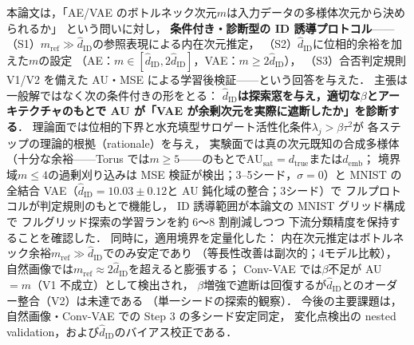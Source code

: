 \documentclass[11pt,a4paper]{jsarticle}
\newcommand{\hatdID}{\hat{d}_{\mathrm{ID}}}
\newcommand{\dtrue}{d_{\mathrm{true}}}
\newcommand{\AUsat}{\mathrm{AU}_{\mathrm{sat}}}
\newcommand{\demb}{d_{\mathrm{emb}}}
\begin{document}
本論文は，「AE/VAE のボトルネック次元$m$は入力データの多様体次元から決められるか」
という問いに対し，
\textbf{条件付き・診断型の ID 誘導プロトコル}——
（S1）$m_{\mathrm{ref}} \gg \hatdID$の参照表現による内在次元推定，
（S2）$\hatdID$に位相的余裕を加えた$m$の設定
（AE：$m \in [\hatdID, 2\hatdID]$，VAE：$m \geq 2\hatdID$），
（S3）合否判定規則 V1/V2 を備えた AU・MSE による学習後検証——という回答を与えた．
主張は一般解ではなく次の条件付きの形をとる：
\textbf{$\hatdID$は探索窓を与え，適切な$\beta$とアーキテクチャのもとで
AU が「VAE が余剰次元を実際に遮断したか」を診断する}．
理論面では位相的下界と水充填型サロゲート活性化条件$\lambda_j > \beta\tau^2$が
各ステップの理論的根拠（rationale）を与え，
実験面では真の次元既知の合成多様体
（十分な余裕——Torus では$m \geq 5$——のもとで$\AUsat = \dtrue$または$\demb$；
境界域$m \leq 4$の過剰刈り込みは MSE 検証が検出；3--5シード，$\sigma = 0$）と
MNIST の全結合 VAE（$\hatdID = 10.03 \pm 0.12$と AU 鈍化域の整合；3シード）で
フルプロトコルが判定規則のもとで機能し，
ID 誘導範囲が本論文の MNIST グリッド構成で
フルグリッド探索の学習ランを約 6〜8 割削減しつつ
下流分類精度を保持することを確認した．
同時に，適用境界を定量化した：
内在次元推定はボトルネック余裕$m_{\mathrm{ref}} \gg \hatdID$でのみ安定であり
（等長性改善は副次的；4モデル比較），
自然画像では$m_{\mathrm{ref}} \approx 2\hatdID$を超えると膨張する；
Conv-VAE では$\beta$不足が AU $= m$（V1 不成立）として検出され，
$\beta$増強で遮断は回復するが$\hatdID$とのオーダー整合（V2）は未達である
（単一シードの探索的観察）．
今後の主要課題は，自然画像・Conv-VAE での Step 3 の多シード安定同定，
変化点検出の nested validation，および$\hatdID$のバイアス校正である．
\end{document}
